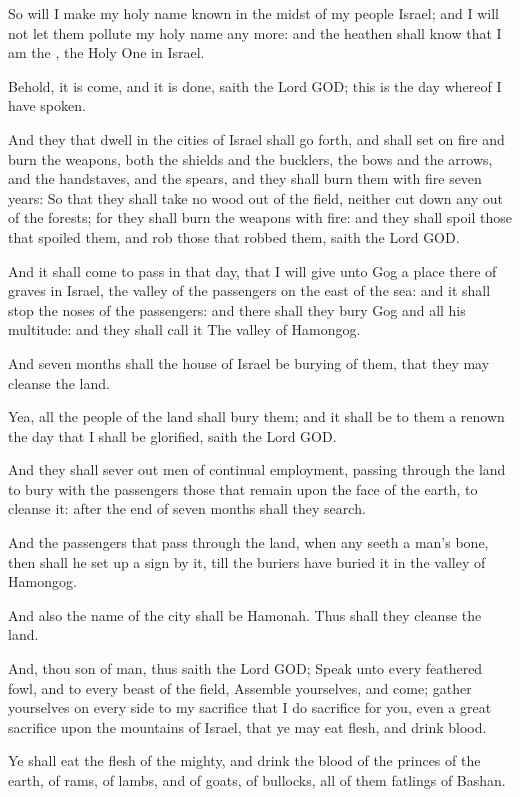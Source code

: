 \Verse So will I make my holy name known in the midst of my people Israel; and I will not let them pollute my holy name any more: and the heathen shall know that I am the \LORD, the Holy One in Israel.

\Verse Behold, it is come, and it is done, saith the Lord GOD; this is the day whereof I have spoken.

\Verse And they that dwell in the cities of Israel shall go forth, and shall set on fire and burn the weapons, both the shields and the bucklers, the bows and the arrows, and the handstaves, and the spears, and they shall burn them with fire seven years: \Verse So that they shall take no wood out of the field, neither cut down any out of the forests; for they shall burn the weapons with fire: and they shall spoil those that spoiled them, and rob those that robbed them, saith the Lord GOD.

\Verse And it shall come to pass in that day, that I will give unto Gog a place there of graves in Israel, the valley of the passengers on the east of the sea: and it shall stop the noses of the passengers: and there shall they bury Gog and all his multitude: and they shall call it The valley of Hamongog.

\Verse And seven months shall the house of Israel be burying of them, that they may cleanse the land.

\Verse Yea, all the people of the land shall bury them; and it shall be to them a renown the day that I shall be glorified, saith the Lord GOD.

\Verse And they shall sever out men of continual employment, passing through the land to bury with the passengers those that remain upon the face of the earth, to cleanse it: after the end of seven months shall they search.

\Verse And the passengers that pass through the land, when any seeth a man's bone, then shall he set up a sign by it, till the buriers have buried it in the valley of Hamongog.

\Verse And also the name of the city shall be Hamonah. Thus shall they cleanse the land.

\Verse And, thou son of man, thus saith the Lord GOD; Speak unto every feathered fowl, and to every beast of the field, Assemble yourselves, and come; gather yourselves on every side to my sacrifice that I do sacrifice for you, even a great sacrifice upon the mountains of Israel, that ye may eat flesh, and drink blood.

\Verse Ye shall eat the flesh of the mighty, and drink the blood of the princes of the earth, of rams, of lambs, and of goats, of bullocks, all of them fatlings of Bashan.


